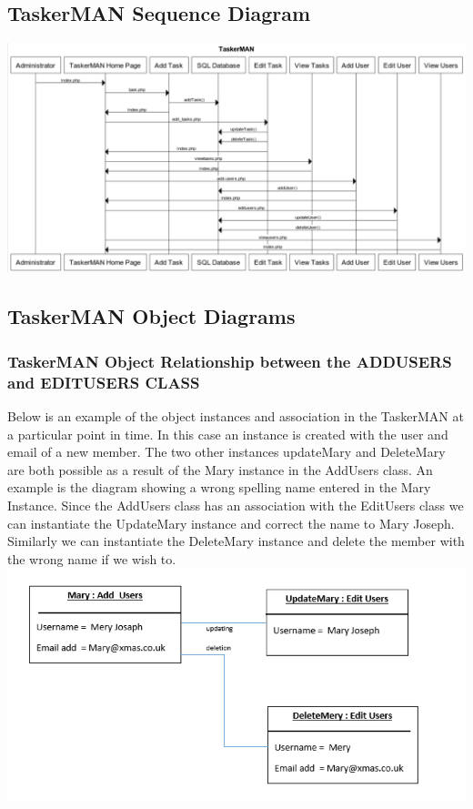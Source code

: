 \documentclass{project}
\begin{document}
\subsection{TaskerMAN Sequence Diagram}
\includegraphics[width=1\textwidth, center]{images/Detailed-Design/TaskerMANSequenceDiagram} \\
\clearpage
\subsection{TaskerMAN Object Diagrams}
\subsubsection{TaskerMAN Object Relationship between the ADD\textunderscore USERS and EDIT\textunderscore USERS CLASS}
Below is an example of the object instances and association in the TaskerMAN at a particular point in time. In this case an instance is created with the user and email of a new member. The two other instances updateMary and DeleteMary are both possible  as a result of the Mary instance in the Add\textunderscore Users class. An example is the diagram showing a wrong spelling name entered in the Mary Instance.  Since the Add\textunderscore Users class has an association with the Edit\textunderscore Users class we can instantiate the UpdateMary instance and correct the name to Mary Joseph. Similarly we can instantiate the DeleteMary instance and delete the member with the wrong name if we wish to. \\
\includegraphics[width=1\textwidth, center]{images/Detailed-Design/TaskerMANObjectDiagram1} \\
\end{document}
